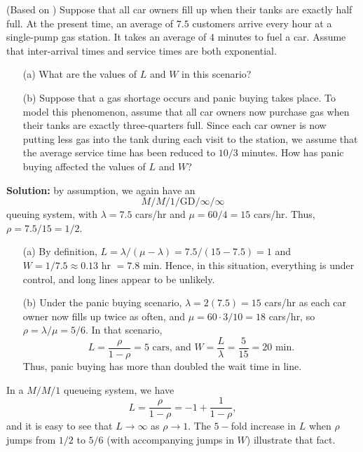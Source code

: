\begin{Example} (Based on \cite{QS_E}) Suppose that all car owners fill up when their tanks are exactly half full.  At the present time, an average of $7.5$ customers arrive every hour at a single-pump gas station. It takes an average of $4$ minutes to fuel a car. Assume that inter-arrival times and service times are both exponential. \begin{itemize}[noitemsep]
	\item[(a)] What are the values of $L$ and $W$ in this scenario? 
	\item[(b)] Suppose that a gas shortage occurs and panic buying takes place. To model this phenomenon, assume that all car owners now purchase gas when their tanks are exactly three-quarters full. Since each car owner is now putting less gas into the tank during each visit to the station, we assume that the average service time has been reduced to $10/3$ minutes. How has panic buying affected the values of $L$ and $W$?
\end{itemize}
\textbf{Solution:} by assumption, we again have an $$M/M/1/\textrm{GD}/\infty/\infty$$ queuing system, with $\lambda = 7.5$ cars/hr and $\mu = 60/4 = 15$ cars/hr.  Thus, $\rho = 7.5/15 = 1/2$.
\begin{enumerate}[noitemsep]
	\item[(a)] By definition, $L = \lambda/(\mu - \lambda) = 7.5/(15-7.5) = 1$ and $W = 1/7.5 \approx 0.13$ hr $=7.8$ min. Hence, in this situation, everything is under control, and long lines appear to be unlikely.
\item[(b)] Under the panic buying scenario,  $\lambda = 2(7.5)=15$ cars/hr as each car owner now fills up twice as often, and $\mu = 60 \cdot 3 /10  = 18$ cars/hr, so $\rho = \lambda/\mu = 5/6$. In that scenario,  
$$ L = \frac{\rho}{1-\rho} = 5 \text{ cars, and } W = \frac{L}{\lambda} = \frac{5}{15} = 20 \text{ min}.$$
Thus, panic buying has more than doubled the wait time in line.
\end{enumerate}
\end{Example}
\newpage\noindent In a $M/M/1$ queueing system, we have $$L=\frac{\rho}{1-\rho}=-1+\frac{1}{1-\rho}, $$ and it is easy to see that $L\to\infty$ as $\rho\to 1$. The $5-$fold increase in $L$ when $\rho$ jumps from $1/2$ to $5/6$ (with accompanying jumps in $W$) illustrate that fact. 
